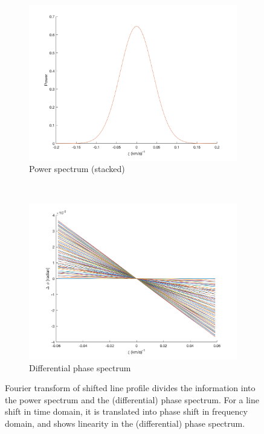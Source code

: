 \begin{figure}[tbp]	
    \begin{subfigure}[b]{0.49\textwidth}
        \includegraphics[width=\textwidth]{./Figures/Methods/2-FT_power.png}
        \caption{Power spectrum (stacked)}
        \label{fig:power_spectrum}
    \end{subfigure}
	~
    \begin{subfigure}[b]{0.49\textwidth}
        \includegraphics[width=\textwidth]{./Figures/Methods/4-Relative_phase_angle.png}
        \caption{Differential phase spectrum}
        \label{fig:dps}
    \end{subfigure}	
    
    \caption[Fourier transform of shifted line profile]{Fourier transform of shifted line profile divides the 
    information into the power spectrum and the (differential) phase spectrum. For a line shift in time domain, 
    it is translated into phase shift in frequency domain, and shows linearity in the (differential) phase spectrum.}
\label{fig:FT_process}
\end{figure}    

